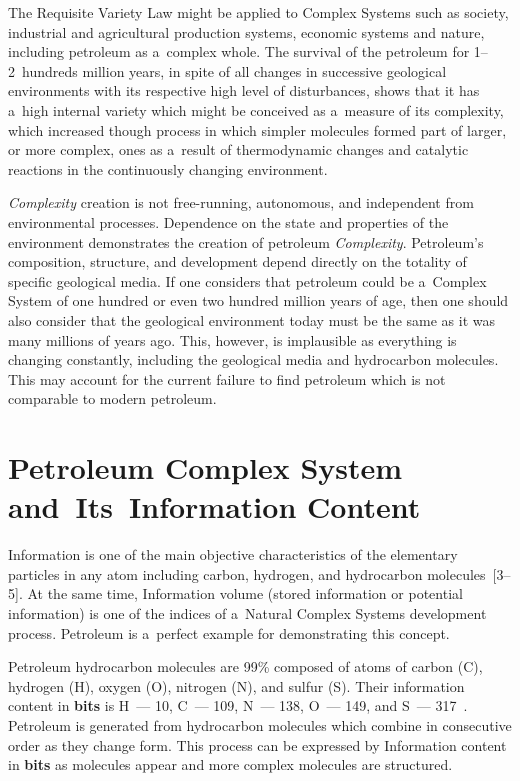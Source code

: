 \begin{multicols}{2}
The Requisite Variety Law might be applied to Complex Systems such as society, industrial and 
agricultural production systems, economic systems and nature, including petroleum as a~complex 
whole. The survival of the petroleum for 1--2~hundreds million years, in spite of all 
changes in successive geological environments with its respective high level of disturbances, 
shows that it has a~high internal variety which might be conceived as a~measure of its complexity, 
which increased though process in which simpler molecules formed part of larger, or more 
complex, ones as a~result of thermodynamic changes and catalytic reactions in the continuously 
changing environment.

\textit{Complexity} creation is not free-running, autonomous, and independent from 
environmental processes. Dependence on the state and properties of the environment demonstrates 
the creation of petroleum \textit{Complexity}. Petroleum's composition, structure, and 
development depend directly on the totality of specific geological media. If one considers that 
petroleum could be a~Complex System of one hundred or even two hundred million years of age, 
then one should also consider that the geological environment today must be the same as it was 
many millions of years ago. This, however, is implausible as everything is changing constantly, 
including the geological media and hydrocarbon molecules. This may account for the current 
failure to find petroleum which is not comparable to modern petroleum.

\vspace*{-6pt}

\section*{Petroleum Complex System and~Its~Information Content}

\noindent
Information is one of the main objective characteristics of the elementary particles in any atom 
including carbon, hydrogen, and hydrocarbon molecules~[3--5]. At the same time, Information 
volume (stored information or potential information) is one of the indices of a~Natural Complex 
Systems development process. Petroleum is a~perfect example for demonstrating this concept. 

Petroleum hydrocarbon molecules are 99\% composed of atoms of carbon (C), hydrogen (H), 
oxygen (O), nitrogen (N), and sulfur (S). Their information content in \textbf{bits} is H~--- 10,  
C~--- 109, N~--- 138, O~--- 149, and S~--- 317~\cite{3-sel}. Petroleum is generated from hydrocarbon 
molecules which combine in consecutive order as they change form. This process can be 
expressed by Information content in \textbf{bits} as molecules appear and more complex 
molecules are structured. 


\end{multicols}
